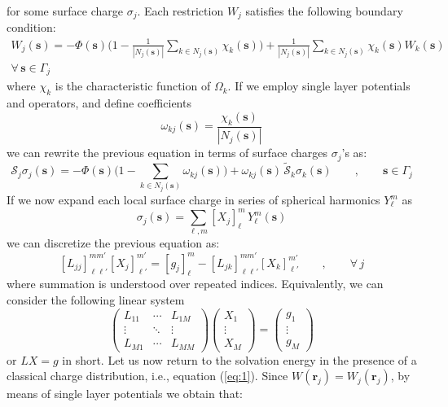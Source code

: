 \documentclass[12pt,letterpaper,oneside]{article}
\theoremstyle{definition}
\begin{document}
for some surface charge $\sigma_j$. Each restriction $W_j$ satisfies the following boundary condition:
\begin{multline*}
W_j(\boldsymbol{s}) = - \Phi(\boldsymbol{s}) \bigg( 1 - \frac{1}{|N_j(\boldsymbol{s}) |} \sum_{k \in N_j(\boldsymbol{s})} \chi_k(\boldsymbol{s}) \bigg) + \frac{1}{|N_j(\boldsymbol{s}) |} \sum_{k \in N_j(\boldsymbol{s})} \chi_k(\boldsymbol{s}) W_k(\boldsymbol{s}) \\
\forall \, \boldsymbol{s} \in \Gamma_j
\end{multline*}
where $\chi_k$ is the characteristic function of $\Omega_k$. If we employ single layer potentials and operators, and define coefficients
\[
\omega_{kj}(\boldsymbol{s}) =  \frac{\chi_k(\boldsymbol{s}) }{|N_j(\boldsymbol{s}) |}
\]
we can rewrite the previous equation in terms of surface charges $\sigma_j$'s as:
\[
\mathcal{S}_j \sigma_j (\boldsymbol{s}) = -\Phi(\boldsymbol{s}) \bigg( 1 - \sum_{k \in N_j(\boldsymbol{s})} \omega_{kj}(\boldsymbol{s}) \bigg) + \omega_{kj}(\boldsymbol{s}) \, \tilde{\mathcal{S}}_k \sigma_k (\boldsymbol{s}) \qquad , \qquad \boldsymbol{s} \in \Gamma_j
\]
If we now expand each local surface charge in series of spherical harmonics $Y_\ell^m$ as
\begin{equation}\label{eq:2}
\sigma_j (\boldsymbol{s})= \sum_{\ell,m} [X_j]_\ell^m \, Y_\ell^m(\boldsymbol{s})
\end{equation}
we can discretize the previous equation as:
\[
[L_{jj} ]_{\ell \ell'}^{m m'} [X_j]_{\ell'}^{m'} = [ g_j ]_\ell^m - [L_{jk} ]_{\ell \ell'}^{m m'} [X_k]_{\ell'}^{m'}  \qquad , \qquad \forall \, j
\]
where summation is understood over repeated indices. Equivalently, we can consider the following linear system
\[
\begin{pmatrix}
L_{11} 	& \cdots 	& L_{1M}  \\
\vdots 	& \ddots 	& \vdots \\
L_{M1} 	& \cdots 	& L_{MM}
\end{pmatrix}
\begin{pmatrix}
X_1 \\ \vdots \\ X_M
\end{pmatrix}
=
\begin{pmatrix}
g_1 \\ \vdots \\ g_M
\end{pmatrix}
\]
or $LX = g$ in short. Let us now return to the solvation energy in the presence of a classical charge distribution, i.e., equation (\ref{eq:1}). Since $W(\boldsymbol{r}_j) = W_j(\boldsymbol{r}_j)$, by means of single layer potentials we obtain that:
\end{document}
